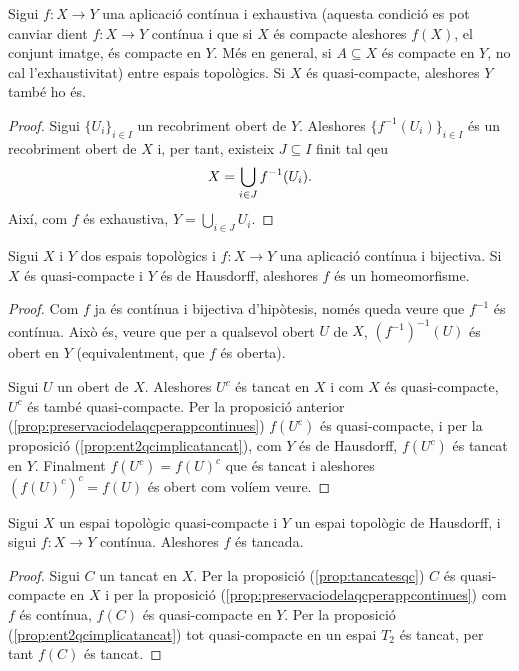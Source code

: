 \documentclass[../main.tex]{subfiles}
\begin{document}
\begin{prop}
\label{prop:preservaciodelaqcperappcontinues} Sigui $f:X\rightarrow Y$ una aplicació contínua i exhaustiva (aquesta condició es pot canviar dient $f:X\rightarrow Y$ contínua i que si $X$ és compacte aleshores $f(X)$, el conjunt imatge, és compacte en $Y$. Més en general, si $A\subseteq X$ és compacte en $Y$, no cal l'exhaustivitat) entre espais topològics. Si $X$ és quasi-compacte, aleshores $Y$ també ho és.
\end{prop}
\begin{proof}
Sigui $\{U_i\}_{i\in I}$ un recobriment obert de $Y$. Aleshores $\{f^{-1}(U_i)\}_{i\in I}$ és un recobriment obert de $X$ i, per tant, existeix $J\subseteq I$ finit tal qeu 
\begin{equation}
    \notag
    X = \bigcup_{i\in J}f^{-1}(U_i).
\end{equation}
Així, com $f$ és exhaustiva, $Y = \bigcup_{i\in J}U_i$.
\end{proof}

\begin{prop}
\label{prop:qchausdorff} Sigui $X$ i $Y$ dos espais topològics i $f:X\rightarrow Y$ una aplicació contínua i bijectiva. Si $X$ és quasi-compacte i $Y$ és de Hausdorff, aleshores $f$ és un homeomorfisme.
\end{prop}
\begin{proof}
Com $f$ ja és contínua i bijectiva d'hipòtesis, només queda veure que $f^{-1}$ és contínua. Això és, veure que per a qualsevol obert $U$ de $X$, $(f^{-1})^{-1}(U)$ és obert en $Y$ (equivalentment, que $f$ és oberta).

Sigui $U$ un obert de $X$. Aleshores $U^c$ és tancat en $X$ i com $X$ és quasi-compacte, $U^c$ és també quasi-compacte. Per la proposició anterior (\ref{prop:preservaciodelaqcperappcontinues}) $f(U^c)$ és quasi-compacte, i per la proposició (\ref{prop:ent2qcimplicatancat}), com $Y$ és de Hausdorff, $f(U^c)$ és tancat en $Y$. Finalment $f(U^c) = f(U)^c$ que és tancat i aleshores $(f(U)^c)^c = f(U)$ és obert com volíem veure.
\end{proof}

\begin{lema}
\label{lema:qchausdorfftapptancada} Sigui $X$ un espai topològic quasi-compacte i $Y$ un espai topològic de Hausdorff, i sigui $f:X\rightarrow Y$ contínua. Aleshores $f$ és tancada.
\end{lema}
\begin{proof}
Sigui $C$ un tancat en $X$. Per la proposició (\ref{prop:tancatesqc}) $C$ és quasi-compacte en $X$ i per la proposició (\ref{prop:preservaciodelaqcperappcontinues}) com $f$ és contínua, $f(C)$ és quasi-compacte en $Y$. Per la proposició (\ref{prop:ent2qcimplicatancat}) tot quasi-compacte en un espai $T_2$ és tancat, per tant $f(C)$ és tancat.
\end{proof}
\end{document}

